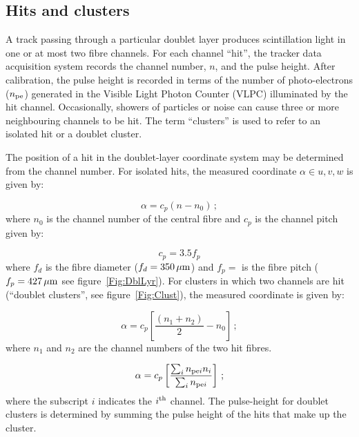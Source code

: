 \subsection{Hits and clusters}
\label{SubSect:SciFiHtsClstrs}

A track passing through a particular doublet layer produces scintillation light in one or at most two fibre channels. For each channel ``hit'', the tracker data acquisition system records the channel number, $n$, and the pulse height. After calibration, the pulse height is recorded in terms of the number of photo-electrons ($n_{\rm pe}$) generated in the Visible Light Photon Counter (VLPC) illuminated by the hit channel. Occasionally, showers of particles or noise can cause three or more neighbouring channels to be hit. The term ``clusters'' is used to refer to an isolated hit or a doublet cluster.

The position of a hit in the doublet-layer coordinate system may be determined from the channel number. For isolated hits, the measured coordinate $\alpha \in {u, v, w}$ is given by:

\begin{equation}
  \alpha = c_p (n - n_0)\,;
\end{equation}
where $n_0$ is the channel number of the central fibre and $c_p$ is the channel pitch given by:

\begin{equation}
  c_p = 3.5f_p
\end{equation}
where $f_d$ is the fibre diameter ($f_d = 350\,\mu{\rm m}$) and $f_p = $ is the fibre pitch ($f_p = 427\,\mu{\rm m}$ see figure~\ref{Fig:DblLyr}). For clusters in which two channels are hit (``doublet clusters'', see figure~\ref{Fig:Clust}), the measured coordinate is given by:

\begin{equation}
  \alpha = c_p \left[ \frac{( n_1 + n_2)}{2} - n_0 \right]\,;
\end{equation}
where $n_1$ and $n_2$ are the channel numbers of the two hit fibres. 

\begin{equation}
  \alpha = c_p \left[ 
                 \frac{\sum_i n_{{\rm pe}i}n_i}{\sum_i n_{{\rm pe}i}} 
               \right]\,;
\end{equation}
where the subscript $i$ indicates the $i^{\rm th}$ channel. The pulse-height for doublet  clusters is determined by summing the pulse height of the hits that make up the cluster.

